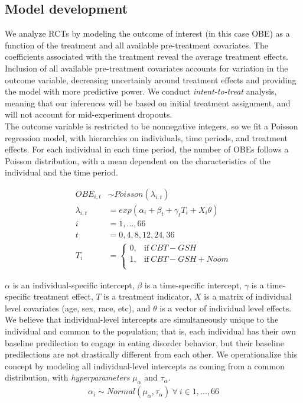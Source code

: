 \documentclass[12pt, oneside]{article}
\begin{document}
\subsection{Model development}

We analyze RCTs by modeling the outcome of interest (in this case OBE) as a function of the treatment and all available pre-treatment covariates.  The coefficients associated with the treatment reveal the average treatment effects.  Inclusion of all available pre-treatment covariates accounts for variation in the outcome variable, decreasing uncertainly around treatment effects and providing the model with more predictive power.  We conduct \emph{intent-to-treat} analysis, meaning that our inferences will be based on initial treatment assignment, and will not account for mid-experiment dropouts.  
\\

The outcome variable is restricted to be nonnegative integers, so we fit a Poisson regression model, with hierarchies on individuals, time periods, and treatment effects.  For each individual in each time period, the number of OBEs follows a Poisson distribution, with a mean dependent on the characteristics of the individual and the time period.  

\begin{align}
OBE_{i,t} &\sim Poisson(\lambda_{i,t}) \\
\lambda_{i,t} &= exp(\alpha_i + \beta_t + \gamma_tT_i + X_i\theta) \\
i &= 1, ..., 66 \\
t &= 0, 4, 8, 12, 24, 36 \\
T_i &=
    \begin{cases}
      0, & \text{if}\ CBT-GSH \\
      1, & \text{if}\ CBT-GSH + Noom \\
    \end{cases}
\end{align}

$\alpha$ is an individual-specific intercept, $\beta$ is a time-specific intercept, $\gamma$ is a time-specific treatment effect, $T$ is a treatment indicator, $X$ is a matrix of individual level covariates (age, sex, race, etc), and $\theta$ is a vector of individual level effects.
\\

We believe that individual-level intercepts are simultaneously unique to the individual and common to the population; that is, each individual has their own baseline predilection to engage in eating disorder behavior, but their baseline predilections are not drastically different from each other.  We operationalize this concept by modeling all individual-level intercepts as coming from a common distribution, with \emph{hyperparameters} $\mu_{\alpha}$ and $\tau_{\alpha}$.
\begin{align}
\alpha_i \sim Normal(\mu_{\alpha}, \tau_{\alpha}) \ \forall \ i \in 1,...,66
\end{align} 
\end{document}
